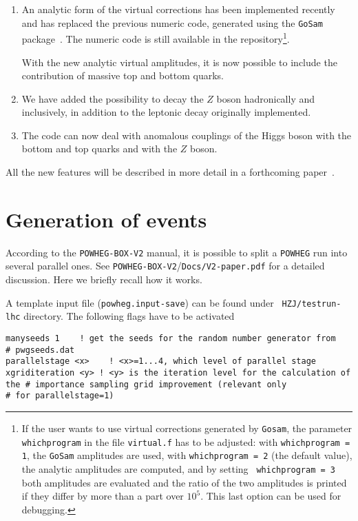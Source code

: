 \documentclass[paper]{JHEP3}
\newcommand\POWHEG{{\tt POWHEG}}
\newcommand\POWHEGBOXV{{\tt POWHEG-BOX-V2}}
\begin{document}
\begin{enumerate}
\item An analytic form of the virtual corrections has been implemented
  recently and has replaced the previous numeric code, generated using the
  {\tt GoSam} package~\cite{Cullen:2011ac}. The numeric code is still
  available in the repository\footnote{If the user wants to use virtual
    corrections generated by {\tt Gosam}, the parameter {\tt whichprogram} in
    the file {\tt virtual.f} has to be adjusted: with {\tt whichprogram = 1},
    the {\tt GoSam} amplitudes are used, with {\tt whichprogram = 2} (the
    default value), the analytic amplitudes are computed, and by setting {\tt
      whichprogram = 3} both amplitudes are evaluated and the ratio of the
    two amplitudes is printed if they differ by more than a part over
    $10^5$. This last option can be used for debugging.}.

   With the new analytic virtual amplitudes, it is now possible to include
   the contribution of massive top and bottom quarks.

\item We have added the possibility to decay the $Z$ boson hadronically and
  inclusively, in addition to the leptonic decay originally implemented.

\item The code can now deal with anomalous couplings of the Higgs
  boson with the bottom and top quarks and with the $Z$ boson.

\end{enumerate}

All the new features will be described in more detail in a forthcoming
paper~\cite{toappear}.




\section{Generation of events}

According to the \POWHEGBOXV{} manual, it is possible to split a \POWHEG{}
run into several parallel ones.  See \POWHEGBOXV{}/{\tt Docs/V2-paper.pdf}
for a detailed discussion. Here we briefly recall how it works.

A template input file ({\tt powheg.input-save}) can be found under {\tt
  HZJ/testrun-lhc} directory. The following flags have to be activated

\noindent
{\tt manyseeds 1 \qquad \quad \,\,\,! get the
  seeds for the random number generator from 
\\ \# \qquad \qquad \qquad
  \qquad \qquad pwgseeds.dat
\\ parallelstage <x> \,\,\,! <x>=1...4, which
  level of parallel stage
\\ xgriditeration <y> ! <y> is the iteration level
  for the calculation of the \# \qquad \qquad \qquad \qquad \qquad importance
  sampling grid improvement (relevant only 
\\ \# \qquad \qquad \qquad \qquad
  \qquad for parallelstage=1)}
\end{document}
